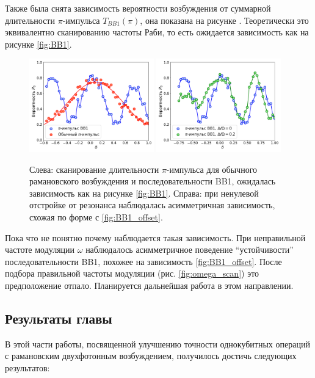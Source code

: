 Также была снята зависимость вероятности возбуждения от суммарной длительности $\pi$-импульса $T_{BB1}(\pi)$, она показана на рисунке . Теоретически это эквивалентно сканированию частоты Раби, то есть ожидается зависимость как на рисунке \ref{fig:BB1}.

\begin{figure}[H]
	\centering
	\includegraphics[width=0.48\textwidth]{images/delta_scan.pdf}
	\includegraphics[width=0.48\textwidth]{images/delta_scan_offset.pdf}
	\caption{Слева: сканирование длительности $\pi$-импульса для обычного рамановского возбуждения и последовательности BB1, ожидалась зависимость как на рисунке \ref{fig:BB1}. Справа: при ненулевой отстройке от резонанса наблюдалась асимметричная зависимость, схожая по форме с \ref{fig:BB1_offset}.}
	\label{fig:BB1_experiment}
\end{figure}

Пока что не понятно почему наблюдается такая зависимость. При неправильной частоте модуляции $\omega$ наблюдалось асимметричное поведение ``устойчивости'' последовательности BB1, похожее на зависимость \ref{fig:BB1_offset}. После подбора правильной частоты модуляции (рис. \ref{fig:omega_scan}) это предположение отпало. Планируется дальнейшая работа в этом направлении.

\subsection{Результаты главы}

В этой части работы, посвященной улучшению точности однокубитных операций с рамановским двухфотонным возбуждением, получилось достичь следующих результатов:

